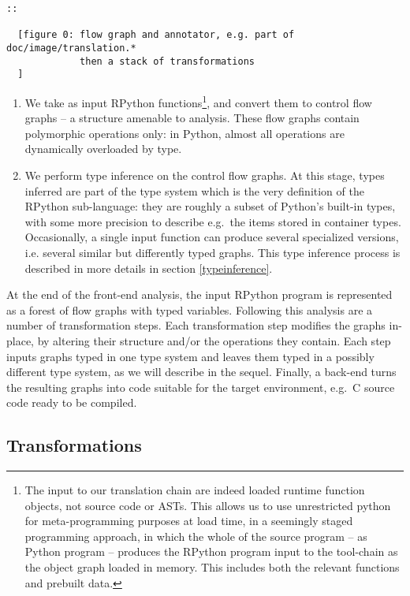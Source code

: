 \documentclass{acm_proc_article-sp}
\begin{document}
\begin{verbatim}
::

  [figure 0: flow graph and annotator, e.g. part of doc/image/translation.*
             then a stack of transformations
  ]
\end{verbatim}
%
\begin{enumerate}
\item We take as input RPython functions\footnote{The input to our
       translation chain are indeed loaded runtime function objects,
       not source code or ASTs.  This allows us to use unrestricted
       python for meta-programming purposes at load time, in a
       seemingly staged programming approach, in which the whole of
       the source program -- as Python program -- produces the RPython
       program input to the tool-chain as the object graph loaded in
       memory.  This includes both the relevant functions and prebuilt
       data.}, and convert them to control flow graphs -- a structure
       amenable to analysis.  These flow graphs contain polymorphic
       operations only: in Python, almost all operations are
       dynamically overloaded by type.

\item We perform type inference on the control flow graphs.  At this
      stage, types inferred are part of the type system which is the
      very definition of the RPython sub-language: they are roughly a
      subset of Python's built-in types, with some more precision to
      describe e.g.\ the items stored in container types.
      Occasionally, a single input function can produce several
      specialized versions, i.e. several similar but differently typed
      graphs.  This type inference process is described in more
      details in section \ref{typeinference}.
\end{enumerate}
At the end of the front-end analysis, the input RPython program is
represented as a forest of flow graphs with typed variables.  Following
this analysis are a number of transformation steps.  Each transformation
step modifies the graphs in-place, by altering their structure and/or
the operations they contain.  Each step inputs graphs typed in one type
system and leaves them typed in a possibly different type system, as we
will describe in the sequel.  Finally, a back-end turns the resulting
graphs into code suitable for the target environment, e.g.\ C source code
ready to be compiled.


\subsection{Transformations}
\end{document}
